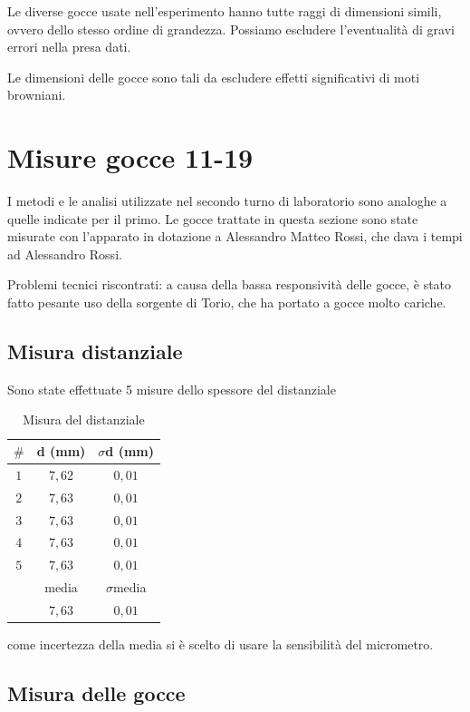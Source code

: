 \documentclass{article}
\begin{document}
Le diverse gocce usate nell'esperimento hanno tutte raggi di dimensioni simili, ovvero dello stesso ordine di grandezza. Possiamo escludere l'eventualità di gravi errori nella presa dati.

Le dimensioni delle gocce sono tali da escludere effetti significativi di moti browniani.

\section{Misure gocce 11-19}

I metodi e le analisi utilizzate nel secondo turno di laboratorio sono analoghe a quelle indicate per il primo. Le gocce trattate in questa sezione sono state misurate con l'apparato in dotazione a Alessandro Matteo Rossi, che dava i tempi ad Alessandro Rossi.

\vspace{5mm}

Problemi tecnici riscontrati: a causa della bassa responsività delle gocce, è stato fatto pesante uso della sorgente di Torio, che ha portato a gocce molto cariche. 

\subsection{Misura distanziale}

Sono state effettuate 5 misure dello spessore del distanziale

\begin{table}[h!]
\centering
\begin{tabular}{ | c | c | c | }
  \hline
  $\#$ & d (mm) & $\sigma$d (mm) \\
  \hline
  $1$ & $7,62$ & $0,01$ \\
  $2$ & $7,63$ & $0,01$ \\
  $3$ & $7,63$ & $0,01$ \\
  $4$ & $7,63$ & $0,01$ \\
  $5$ & $7,63$ & $0,01$ \\
  \hline
  & media & $\sigma$media \\
  \hline
  & $7,63$ & $0,01$ \\
  \hline
\end{tabular}
  \caption{Misura del distanziale}
  \label{dist_2}
\end{table}

come incertezza della media si è scelto di usare la sensibilità del micrometro.

\subsection{Misura delle gocce}
\end{document}
